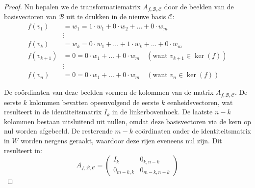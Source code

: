 \begin{proof}
    Nu bepalen we de transformatiematrix $A_{f,\mathcal{B},\mathcal{C}}$ door de beelden van de basisvectoren van $\mathcal{B}$ uit te drukken in de nieuwe basis $\mathcal{C}$:
    $$\begin{aligned}
        f(v_1) &= w_1 = 1\cdot w_1 + 0\cdot w_2 + \dots + 0\cdot w_m \\
        &\vdots \\
        f(v_k) &= w_k = 0\cdot w_1 + \dots + 1\cdot w_k + \dots + 0\cdot w_m \\
        f(v_{k+1}) &= 0 = 0\cdot w_1 + \dots + 0\cdot w_m \quad (\text{want } v_{k+1} \in \ker(f)) \\
        &\vdots \\
        f(v_n) &= 0 = 0\cdot w_1 + \dots + 0\cdot w_m \quad (\text{want } v_n \in \ker(f))
    \end{aligned}$$

    De coördinaten van deze beelden vormen de kolommen van de matrix $A_{f,\mathcal{B},\mathcal{C}}$.
    De eerste $k$ kolommen bevatten opeenvolgend de eerste $k$ eenheidsvectoren, wat resulteert in de identiteitsmatrix $I_k$ in de linkerbovenhoek.
    De laatste $n-k$ kolommen bestaan uitsluitend uit nullen, omdat deze basisvectoren via de kern op nul worden afgebeeld.
    De resterende $m-k$ coördinaten onder de identiteitsmatrix in $W$ worden nergens geraakt, waardoor deze rijen eveneens nul zijn.
    Dit resulteert in:
    $$A_{f,\mathcal{B},\mathcal{C}} = \left(\begin{array}{c|c}
        I_k & 0_{k,n-k} \\ \hline
        0_{m-k,k} & 0_{m-k,n-k}
    \end{array}\right)$$
\end{proof}
